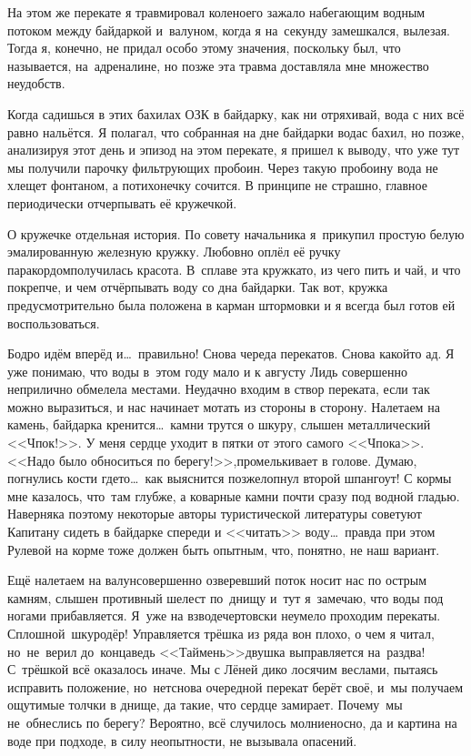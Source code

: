 На этом же перекате я травмировал колено\mdash его зажало набегающим водным потоком между байдаркой и~валуном, когда я на~секунду замешкался, вылезая. Тогда я, конечно, не придал особо этому значения, поскольку был, что называется, на~адреналине, но позже эта травма доставляла мне множество неудобств.

Когда садишься в этих бахилах ОЗК в байдарку, как ни отряхивай, вода с них всё равно нальётся. Я полагал, что собранная на дне байдарки вода\mdash с бахил, но позже, анализируя этот день и эпизод на этом перекате, я пришел к выводу, что уже тут мы получили парочку фильтрующих пробоин. Через такую пробоину вода не хлещет фонтаном, а потихонечку сочится. В принципе не страшно, главное периодически отчерпывать её кружечкой.

О кружечке отдельная история. По совету начальника я~прикупил простую белую эмалированную железную кружку. Любовно оплёл её ручку паракордом\mdash получилась красота. В~сплаве эта кружка\mdash то, из чего пить и чай, и что покрепче, и чем отчёрпывать воду со дна байдарки. Так вот, кружка предусмотрительно была положена в карман штормовки и я всегда был готов ей воспользоваться.

Бодро идём вперёд и\ldots~правильно! Снова череда перекатов. Снова какой\sdash то ад. Я уже понимаю, что воды в~этом году мало и к августу Лидь совершенно неприлично обмелела местами. Неудачно входим в створ переката, если так можно выразиться, и нас начинает мотать из стороны в сторону. Налетаем на камень, байдарка кренится\ldots~камни трутся о шкуру, слышен металлический <<Чпок!>>. У меня сердце уходит в пятки от этого самого <<Чпока>>. <<Надо было обноситься по берегу!>>,\mdash промелькивает в голове. Думаю, погнулись кости где\sdash то\ldots~как выяснится позже\mdash лопнул второй шпангоут! С кормы мне казалось, что~там глубже, а коварные камни почти сразу под водной гладью. Наверняка поэтому некоторые авторы туристической литературы советуют Капитану сидеть в байдарке спереди и <<читать>> воду\ldots~правда при этом Рулевой на корме тоже должен быть опытным, что, понятно, не наш вариант.

Ещё налетаем на валун\mdash совершенно озверевший поток носит нас по острым камням, слышен противный шелест по~днищу и~тут я~замечаю, что воды под ногами прибавляется. Я~уже на взводе\mdash чертовски неумело проходим перекаты. Сплошной~шкуродёр! Управляется трёшка из ряда вон плохо, о чем я читал, но~не~верил до~конца\mdash ведь <<Таймень>>\sdash двушка выправляется на~раз\sdash два! С~трёшкой всё оказалось иначе. Мы с Лёней дико лосячим веслами, пытаясь исправить положение, но~нет\mdash снова очередной перекат берёт своё, и~мы получаем ощутимые толчки в днище, да такие, что сердце замирает. Почему~мы не~обнеслись по берегу? Вероятно, всё случилось молниеносно, да и картина на воде при подходе, в силу неопытности, не вызывала опасений.

